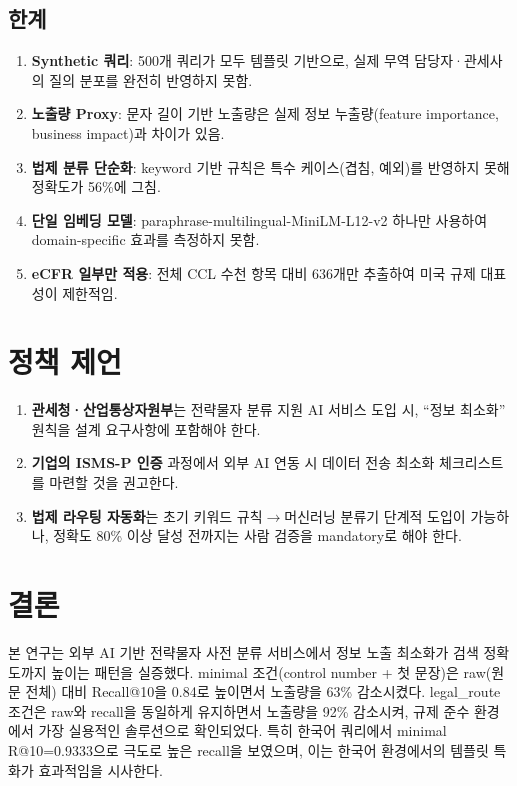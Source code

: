 \documentclass[11pt,a4paper]{article}
\begin{document}
\subsection{한계}
\begin{enumerate}
\item \textbf{Synthetic 쿼리}: 500개 쿼리가 모두 템플릿 기반으로, 실제 무역 담당자·관세사의 질의 분포를 완전히 반영하지 못함.
\item \textbf{노출량 Proxy}: 문자 길이 기반 노출량은 실제 정보 누출량(feature importance, business impact)과 차이가 있음.
\item \textbf{법제 분류 단순화}: keyword 기반 규칙은 특수 케이스(겹침, 예외)를 반영하지 못해 정확도가 56\%에 그침.
\item \textbf{단일 임베딩 모델}: paraphrase-multilingual-MiniLM-L12-v2 하나만 사용하여 domain-specific 효과를 측정하지 못함.
\item \textbf{eCFR 일부만 적용}: 전체 CCL 수천 항목 대비 636개만 추출하여 미국 규제 대표성이 제한적임.
\end{enumerate}

\section{정책 제언}
\label{sec:policy}

\begin{enumerate}
\item \textbf{관세청·산업통상자원부}는 전략물자 분류 지원 AI 서비스 도입 시, ``정보 최소화'' 원칙을 설계 요구사항에 포함해야 한다.
\item \textbf{기업의 ISMS-P 인증} 과정에서 외부 AI 연동 시 데이터 전송 최소화 체크리스트를 마련할 것을 권고한다.
\item \textbf{법제 라우팅 자동화}는 초기 키워드 규칙$\to$머신러닝 분류기 단계적 도입이 가능하나, 정확도 80\% 이상 달성 전까지는 사람 검증을 mandatory로 해야 한다.
\end{enumerate}

\section{결론}
본 연구는 외부 AI 기반 전략물자 사전 분류 서비스에서 정보 노출 최소화가 검색 정확도까지 높이는 패턴을 실증했다. minimal 조건(control number + 첫 문장)은 raw(원문 전체) 대비 Recall@10을 0.84로 높이면서 노출량을 63\% 감소시켰다. legal\_route 조건은 raw와 recall을 동일하게 유지하면서 노출량을 92\% 감소시켜, 규제 준수 환경에서 가장 실용적인 솔루션으로 확인되었다. 특히 한국어 쿼리에서 minimal R@10=0.9333으로 극도로 높은 recall을 보였으며, 이는 한국어 환경에서의 템플릿 특화가 효과적임을 시사한다.
\end{document}

